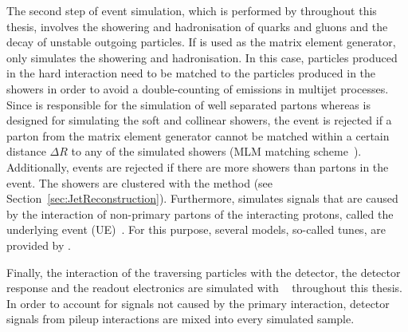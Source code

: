 The second step of event simulation, which is performed by \pythiaSix throughout this thesis, involves the showering and hadronisation of quarks and gluons and the decay of unstable outgoing particles.
If \madgraph is used as the matrix element generator, \pythia only simulates the showering and hadronisation. In this case, particles produced in the hard interaction need to be matched to the particles produced in the showers in order to avoid a double-counting of emissions in multijet processes.
Since \madgraph is responsible for the simulation of well separated partons whereas \pythia is designed for simulating the soft and collinear showers, the event is rejected if a parton from the matrix element generator cannot be matched within a certain distance $\Delta R$ to any of the simulated showers (MLM matching scheme~\cite{bib:MLM_matching}).
Additionally, events are rejected if there are more showers than partons in the event.
The showers are clustered with the \kt method (see Section~\ref{sec:JetReconstruction}).
Furthermore, \pythia simulates signals that are caused by the interaction of non-primary partons of the interacting protons, called the underlying event (UE)~\cite{bib:CMS:UE_2011}.
For this purpose, several models, so-called tunes, are provided by \pythia.

Finally, the interaction of the traversing particles with the detector, the detector response and the readout electronics are simulated with \geant~\cite{bib:Geant4_2003,bib:Geant4_2006} throughout this thesis.
In order to account for signals not caused by the primary interaction, detector signals from pileup interactions are mixed into every simulated sample.
